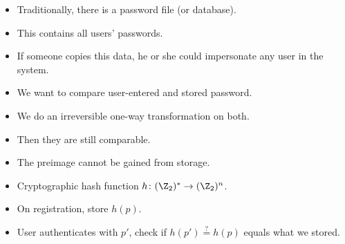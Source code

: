 \begin{frame}
  \begin{example}
    \begin{itemize}
      \item Traditionally, there is a password file (or database).
      \item This contains all users' passwords.

        \pause{}

      \item If someone copies this data, he or she could impersonate any user 
        in the system.
    \end{itemize}
  \end{example}
\end{frame}

\begin{frame}
  \begin{solution}[Passwords]
    \begin{itemize}
      \item We want to compare user-entered and stored password.
      \item We do an irreversible one-way transformation on both.
      \item Then they are still comparable.
      \item The preimage cannot be gained from storage.
    \end{itemize}
  \end{solution}

  \pause{}

  \begin{example}
    \begin{itemize}
      \item Cryptographic hash function \(h\colon (\Z_2)^*\to (\Z_2)^n\).
      \item On registration, store \(h(p)\).
      \item User authenticates with \(p'\), check if \(h(p') \stackrel{?}{=}  
          h(p)\) equals what we stored.
    \end{itemize}
  \end{example}
\end{frame}

